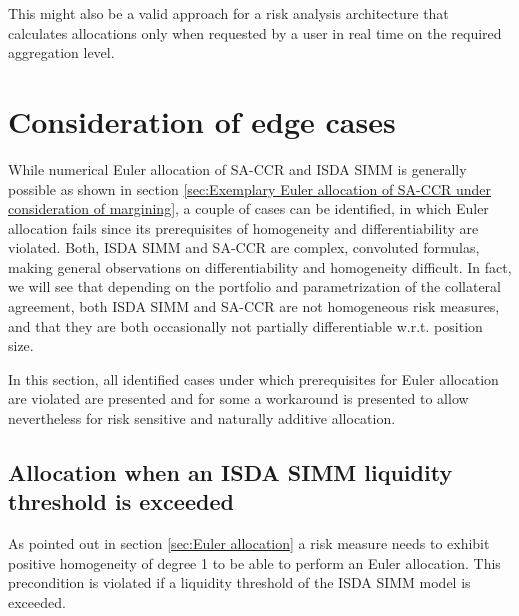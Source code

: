 \documentclass[../Thesis_AHoecherl.tex]{subfiles}
\begin{document}
    This might also be a valid approach for a risk analysis architecture that calculates allocations only when requested by a user in real time on the required aggregation level. 

    

    \section{Consideration of edge cases\label{sec:Consideration of edge cases}}

    While numerical Euler allocation of \gls{SA-CCR} and \gls{ISDA SIMM} is generally possible as shown in section \ref{sec:Exemplary Euler allocation of SA-CCR under consideration of margining}, a couple of cases can be identified, in which Euler allocation fails since its prerequisites of homogeneity and differentiability are violated.
    Both, \gls{ISDA SIMM} and \gls{SA-CCR} are complex, convoluted formulas, making general observations on differentiability and homogeneity difficult.
    In fact, we will see that depending on the portfolio and parametrization of the collateral agreement, both \gls{ISDA SIMM} and \gls{SA-CCR} are not homogeneous risk measures, and that they are both occasionally not partially differentiable w.r.t. position size.
    
    In this section, all identified cases under which prerequisites for Euler allocation are violated are presented and for some a workaround is presented to allow nevertheless for risk sensitive and naturally additive allocation.
    
    \subsection{Allocation when an ISDA SIMM liquidity threshold is exceeded\label{sec:Allocation when an ISDA-SIMM liquidity threshold is exceeded}}
    
    As pointed out in section \ref{sec:Euler allocation} a risk measure needs to exhibit positive homogeneity of degree 1 to be able to perform an Euler allocation.
    This precondition is violated if a liquidity threshold of the \gls{ISDA SIMM} model is exceeded.
\end{document}
